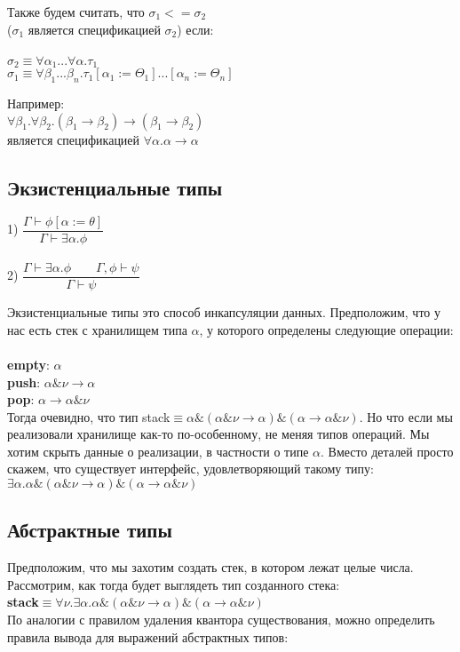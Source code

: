 	 Также будем считать, что $ \sigma_1 <= \sigma_2 $\\
	 ($\sigma_1$ является спецификацией $\sigma_2$) если: \\\\
	 $\sigma_2\equiv\forall\alpha_1...\forall\alpha.\tau_1$\\
	 $\sigma_1\equiv\forall\beta_1...\beta_n.\tau_1[\alpha_1:=\Theta_1]...[\alpha_n:=\Theta_n]  $
	 
	 \noindent Например:\\
	 $ \forall\beta_1.\forall\beta_2.(\beta_1\rightarrow\beta_2)\rightarrow(\beta_1\rightarrow\beta_2) $\\
	 является спецификацией $ \forall\alpha.\alpha\rightarrow\alpha $\\
	 \subsection{Экзистенциальные типы}
	 1) $\dfrac{\Gamma\vdash\phi[\alpha:=\theta]}{\Gamma\vdash\exists\alpha.\phi}$\\ \\
	 2) $\dfrac{\Gamma\vdash\exists\alpha.\phi\qquad\Gamma,\phi\vdash\psi}{\Gamma\vdash\psi}$
	 
	  Экзистенциальные типы это способ инкапсуляции данных. Предположим, что у нас есть стек с хранилищем типа $\alpha$, у которого определены следующие операции:\\\\
	 \textbf{empty}: $\alpha$\\
	 \textbf{push}: $\alpha\&\nu\rightarrow\alpha$\\
	 \textbf{pop}: $\alpha\rightarrow\alpha\&\nu$\\
	 
	 Тогда очевидно, что тип stack$\equiv\alpha\&(\alpha\&\nu\rightarrow\alpha)\&(\alpha\rightarrow\alpha\&\nu)$.
	 Но что если мы реализовали хранилище как-то по-особенному, не меняя типов операций. Мы хотим скрыть данные о реализации, в частности о типе $\alpha$. Вместо деталей просто скажем, что существует интерфейс, удовлетворяющий такому типу:\\$\exists\alpha.\alpha\&(\alpha\&\nu\rightarrow\alpha)\&(\alpha\rightarrow\alpha\&\nu)$
	 
	 \subsection{Абстрактные типы}	 
	 Предположим, что мы захотим создать стек, в котором лежат целые числа. Рассмотрим, как тогда будет выглядеть тип созданного стека: \\
	 \textbf{stack}$\equiv\forall\nu.\exists\alpha.\alpha\&(\alpha\&\nu\rightarrow\alpha)\&(\alpha\rightarrow\alpha\&\nu)$\\
 	По аналогии с правилом удаления квантора существования, можно определить правила вывода для выражений абстрактных типов: \\

